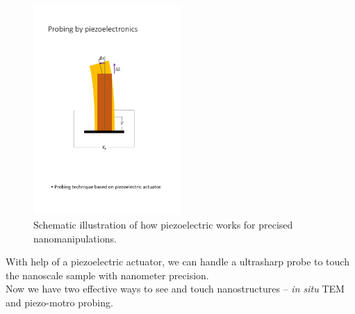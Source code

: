 \begin{figure}  
\centering
\includegraphics[width=160pt]{figures/figure1_piezo.pdf}
\caption[Probing by piezoelectronics]{Schematic illustration of how piezoelectric works for precised nanomanipulations.
\label{fig:1piezo}}
\end{figure}

With help of a piezoelectric actuator, we can handle a ultrasharp probe to touch the nanoscale sample with nanometer precision. 
\\
Now we have two effective ways to see and touch nanostructures -- {\em in situ} TEM and piezo-motro probing. 


